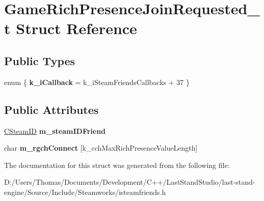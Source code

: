 \hypertarget{structGameRichPresenceJoinRequested__t}{}\section{Game\+Rich\+Presence\+Join\+Requested\+\_\+t Struct Reference}
\label{structGameRichPresenceJoinRequested__t}
\subsection*{Public Types}
\begin{DoxyCompactItemize}
\item 
\hypertarget{structGameRichPresenceJoinRequested__t_a5c038f2706cb38fd3f8776231efe8834}{}enum \{ {\bfseries k\+\_\+i\+Callback} = k\+\_\+i\+Steam\+Friends\+Callbacks + 37
 \}\label{structGameRichPresenceJoinRequested__t_a5c038f2706cb38fd3f8776231efe8834}

\end{DoxyCompactItemize}
\subsection*{Public Attributes}
\begin{DoxyCompactItemize}
\item 
\hypertarget{structGameRichPresenceJoinRequested__t_a13d994983fb94969da7191d40761c2e8}{}\hyperlink{classCSteamID}{C\+Steam\+I\+D} {\bfseries m\+\_\+steam\+I\+D\+Friend}\label{structGameRichPresenceJoinRequested__t_a13d994983fb94969da7191d40761c2e8}

\item 
\hypertarget{structGameRichPresenceJoinRequested__t_a6886af3808c473f4cd0982c7a2ab8428}{}char {\bfseries m\+\_\+rgch\+Connect} \mbox{[}k\+\_\+cch\+Max\+Rich\+Presence\+Value\+Length\mbox{]}\label{structGameRichPresenceJoinRequested__t_a6886af3808c473f4cd0982c7a2ab8428}

\end{DoxyCompactItemize}


The documentation for this struct was generated from the following file\+:\begin{DoxyCompactItemize}
\item 
D\+:/\+Users/\+Thomas/\+Documents/\+Development/\+C++/\+Last\+Stand\+Studio/last-\/stand-\/engine/\+Source/\+Include/\+Steamworks/isteamfriends.\+h\end{DoxyCompactItemize}
